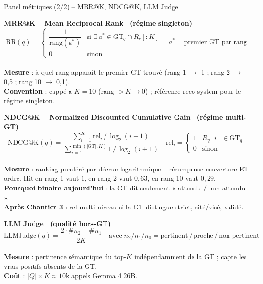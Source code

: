 \documentclass[aspectratio=169,10pt]{beamer}
\begin{document}
\begin{frame}{Panel métriques (2/2) -- MRR@K, NDCG@K, LLM Judge}
  \footnotesize

  \textbf{\color{ok}MRR@K -- Mean Reciprocal Rank \ (régime singleton)}
  \vspace{-0.2em}
  \[
    \mathrm{RR}(q) =
    \begin{cases}
      \dfrac{1}{\mathrm{rang}(a^*)} & \text{si } \exists\, a^* \in \mathrm{GT}_q \cap R_q[{:}K] \\[0.3em]
      0 & \text{sinon}
    \end{cases}
    \quad a^* = \text{premier GT par rang}
  \]
  \vspace{-0.6em} \\
  \textbf{Mesure} : à quel rang apparaît le premier GT trouvé (rang 1 $\to$ 1 ; rang 2 $\to$ 0,5 ; rang 10 $\to$ 0,1). \\
  \textbf{Convention} : cappé à $K{=}10$ (rang $>K \to 0$) ; référence reco system pour le régime singleton.

  \vspace{0.3em}\hrulefill\vspace{0.2em}

  \textbf{\color{ok}NDCG@K -- Normalized Discounted Cumulative Gain \ (régime multi-GT)}
  \vspace{-0.2em}
  \[
    \mathrm{NDCG@K}(q) = \frac{\sum_{i=1}^{K} \mathrm{rel}_i \,/\, \log_2(i{+}1)}
                              {\sum_{i=1}^{\min(|\mathrm{GT}|,K)} 1 \,/\, \log_2(i{+}1)}
    \quad \mathrm{rel}_i =
    \begin{cases} 1 & R_q[i]\in\mathrm{GT}_q \\ 0 & \text{sinon} \end{cases}
  \]
  \vspace{-0.6em} \\
  \textbf{Mesure} : ranking pondéré par décrue logarithmique -- récompense couverture ET ordre. Hit en rang 1 vaut $1$, en rang 2 vaut $0{,}63$, en rang 10 vaut $0{,}29$. \\
  \textbf{Pourquoi binaire aujourd'hui} : la GT dit seulement « attendu / non attendu ». \\
  \textbf{Après Chantier 3} : rel multi-niveau si la GT distingue strict, cité/visé, validé.

  \vspace{0.3em}\hrulefill\vspace{0.2em}

  \textbf{\color{crosscol}LLM Judge \ (qualité hors-GT)}
  \vspace{-0.2em}
  \[
    \mathrm{LLMJudge}(q) = \frac{2\cdot \#n_2 + \#n_1}{2K}
    \quad\text{avec } n_2 / n_1 / n_0 = \text{pertinent} \,/\, \text{proche} \,/\, \text{non pertinent}
  \]
  \vspace{-0.6em} \\
  \textbf{Mesure} : pertinence sémantique du top-$K$ indépendamment de la GT ; capte les vrais positifs absents de la GT. \\
  \textbf{Coût} : $|Q|\!\times\!K\approx 10\mathrm{k}$ appels Gemma 4 26B.
\end{frame}
\end{document}

